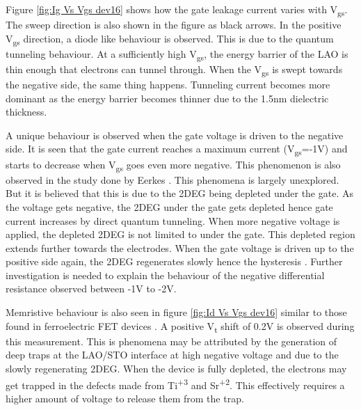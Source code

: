 \documentclass[11pt,a4paper]{report}
\begin{document}
Figure \ref{fig:Ig Vs Vgs dev16} shows how the gate leakage current varies with V\textsubscript{gs}. The sweep direction is also shown in the figure as black arrows. In the positive V\textsubscript{gs} direction, a diode like behaviour is observed. This is due to the quantum tunneling behaviour. At a sufficiently high V\textsubscript{gs}, the energy barrier of the LAO is thin enough that electrons can tunnel through. When the V\textsubscript{gs} is swept towards the negative side, the same thing happens. Tunneling current becomes more dominant as the energy barrier becomes thinner due to the 1.5\si{\nano\metre} dielectric thickness.

A unique behaviour is observed when the gate voltage is driven to the negative side. It is seen that the gate current reaches a maximum current (V\textsubscript{gs}=-1V) and starts to decrease when V\textsubscript{gs} goes even more negative. This phenomenon is also observed in the study done by Eerkes \cite{Peter_PHD_Thesis}. This phenomena is largely unexplored. But it is believed that this is due to the 2DEG being depleted under the gate. As the voltage gets negative, the 2DEG under the gate gets depleted hence gate current increases by direct quantum tunneling. When more negative voltage is applied, the depleted 2DEG is not limited to under the gate. This depleted region extends further towards the electrodes. When the gate voltage is driven up to the positive side again, the 2DEG regenerates slowly hence the hysteresis \cite{Peter_PHD_Thesis, kim_kim_lim_jeong_kwon_baek_kim_2015}. Further investigation is needed to explain the behaviour of the negative differential resistance observed between -1V to -2V.

Memristive behaviour is also seen in figure \ref{fig:Id Vs Vgs dev16} similar to those found in ferroelectric FET devices \cite{wang_liu_2017}. A positive V\textsubscript{t} shift of 0.2V is observed during this measurement. This is phenomena may be attributed by the generation of deep traps at the LAO/STO interface at high negative voltage \cite{kim_kim_lim_jeong_kwon_baek_kim_2015} and due to the slowly regenerating 2DEG. When the device is fully depleted, the electrons may get trapped in the defects made from Ti\textsuperscript{+3} and Sr\textsuperscript{+2}\cite{yu_zunger_2014}. This effectively requires a higher amount of voltage to release them from the trap.
\end{document}
